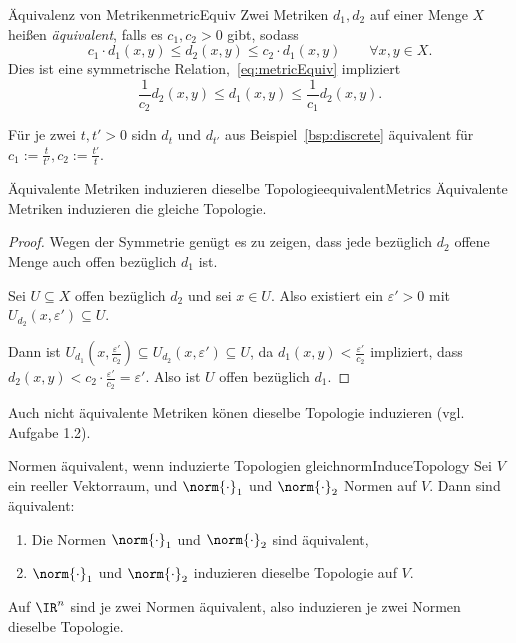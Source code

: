 \documentclass[language=ngerman]{TemplateLecture} %
\begin{document}
\begin{defi}{Äquivalenz von Metriken}{metricEquiv}
    Zwei Metriken $d_1, d_2$ auf einer Menge $X$ heißen \emph{äquivalent}, falls es $c_1, c_2 > 0$ gibt, sodass
    \begin{equation}
        c_1 \cdot d_1(x,y) \leq d_2(x,y) \leq c_2 \cdot d_1(x,y) \quad \quad \forall x,y \in X. \label{eq:metricEquiv}
    \end{equation}
    Dies ist eine symmetrische Relation,~\eqref{eq:metricEquiv} impliziert 
    \begin{equation*}
        \frac{1}{c_2} d_2(x,y) \leq d_1(x,y) \leq \frac{1}{c_1} d_2(x,y).
    \end{equation*}
\end{defi}

\begin{example}
    Für je zwei $t, t' > 0$ sidn $d_t$ und $d_{t'}$ aus Beispiel~\ref{bsp:discrete} äquivalent für $c_1 := \frac{t}{t'}, c_2 := \frac{t'}{t}$.
\end{example}

\begin{thm}{Äquivalente Metriken induzieren dieselbe Topologie}{equivalentMetrics}
    Äquivalente Metriken induzieren die gleiche Topologie.
\end{thm}
\begin{proof}
    Wegen der Symmetrie genügt es zu zeigen, dass jede bezüglich $d_2$ offene Menge auch offen bezüglich $d_1$ ist.

    Sei $U \subseteq X$ offen bezüglich $d_2$ und sei $x \in U$. Also existiert ein $\varepsilon' > 0$ mit $U_{d_2}(x, \varepsilon') \subseteq U$.

    Dann ist $U_{d_1}(x, \frac{\varepsilon'}{c_2}) \subseteq U_{d_2}(x, \varepsilon') \subseteq U$, da $d_1(x,y) < \frac{\varepsilon'}{c_2}$ impliziert, dass $d_2(x,y) < c_2 \cdot \frac{\varepsilon'}{c_2} = \varepsilon'$. Also ist $U$ offen bezüglich $d_1$.
\end{proof}

\begin{remark}
    Auch nicht äquivalente Metriken könen dieselbe Topologie induzieren (vgl. Aufgabe 1.2).
\end{remark}

\begin{thm}{Normen äquivalent, wenn induzierte Topologien gleich}{normInduceTopology}
    Sei $V$ ein reeller Vektorraum, und $\norm{\cdot}_1$ und $\norm{\cdot}_2$ Normen auf $V$. Dann sind äquivalent:
    \begin{enumerate}[$(i)$]
        \item Die Normen $\norm{\cdot}_1$ und $\norm{\cdot}_2$ sind äquivalent,
        \item $\norm{\cdot}_1$ und $\norm{\cdot}_2$ induzieren dieselbe Topologie auf $V$.
    \end{enumerate}
    Auf $\IR^n$ sind je zwei Normen äquivalent, also induzieren je zwei Normen dieselbe Topologie.
\end{thm}
\end{document}
